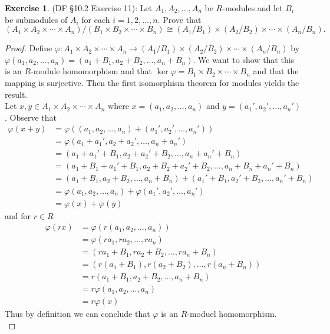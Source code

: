 \documentclass[8pt]{amsart}
\theoremstyle{plain}%
\theoremstyle{definition}
\newtheorem{exercise}{Exercise}[section]
\theoremstyle{remark}
\numberwithin{equation}{section}
\begin{document}
\begin{exercise}
(DF \S 10.2 Exercise 11): Let $A_1, A_2, \ldots, A_n$ be $R$-modules and let $B_i$ be submodules of $A_i$ for each $i = 1, 2, \ldots, n$. Prove that $$(A_1 \times A_2 \times \cdots \times A_n)/(B_1 \times B_2 \times \cdots \times B_n) \cong (A_1/B_1) \times (A_2/B_2) \times \cdots \times (A_n/B_n).$$
	\begin{proof}
		Define $\varphi : A_1 \times A_2 \times \cdots \times A_n \to (A_1/B_1) \times (A_2/B_2) \times \cdots \times (A_n/B_n)$ by $\varphi(a_1, a_2, \ldots, a_n) = (a_1 + B_1, a_2 + B_2, \ldots, a_n + B_n)$. We want to show that this is an $R$-module homomorphism and that $\ker \varphi = B_1 \times B_2 \times \cdots \times B_n$ and that the mapping is surjective. Then the first isomorphism theorem for modules yields the result.\\

		Let $x, y \in A_1 \times A_2 \times \cdots \times A_n$ where $x = (a_1, a_2, \ldots, a_n)$ and $y = (a_1', a_2', \ldots, a_n')$. Observe that
		\begin{align*}
			\varphi(x + y) &= \varphi((a_1, a_2, \ldots, a_n) + (a_1', a_2', \ldots, a_n'))\\
			&= \varphi(a_1 + a_1', a_2 + a_2', \ldots, a_n + a_n')\\
			&= (a_1 + a_1' + B_1, a_2 + a_2' + B_2, \ldots, a_n + a_n' + B_n)\\
			&= (a_1 + B_1 + a_1' + B_1, a_2 + B_2 + a_2' + B_2, \ldots, a_n + B_n + a_n' + B_n)\\
			&= (a_1 + B_1, a_2 + B_2, \ldots, a_n + B_n) + (a_1' + B_1, a_2' + B_2, \ldots, a_n' + B_n)\\
			&= \varphi(a_1, a_2, \ldots, a_n) + \varphi(a_1', a_2', \ldots, a_n')\\
			&= \varphi(x) + \varphi(y)
		\end{align*}
		and for $r \in R$
		\begin{align*}
			\varphi(rx) &= \varphi(r(a_1, a_2, \ldots, a_n))\\
			&= \varphi(ra_1, ra_2, \ldots, ra_n)\\
			&= (ra_1 + B_1, ra_2 + B_2, \ldots, ra_n + B_n)\\
			&= (r(a_1 + B_1), r(a_2 + B_2), \ldots, r(a_n + B_n))\\
			&= r(a_1 + B_1, a_2 + B_2, \ldots, a_n + B_n)\\
			&= r\varphi(a_1, a_2, \ldots, a_n)\\
			&= r\varphi(x)
		\end{align*}
		Thus by definition we can conclude that $\varphi$ is an $R$-moduel homomorphism.\\


\end{proof}
\end{exercise}
\end{document}
